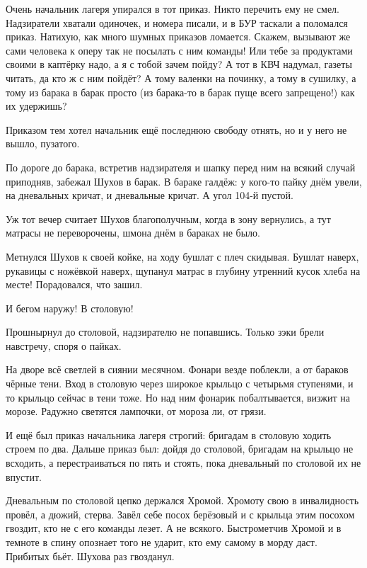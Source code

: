 Очень начальник лагеря упирался в тот приказ. Никто перечить ему не смел. Надзиратели
хватали одиночек, и номера писали, и в БУР таскали \dash а поломался приказ. Натихую, как много
шумных приказов ломается. Скажем, вызывают же сами человека к оперу \dash так не посылать с ним
команды! Или тебе за продуктами своими в каптёрку надо, а я с тобой зачем пойду? А тот в КВЧ
надумал, газеты читать, да кто ж с ним пойдёт? А тому валенки на починку, а тому в сушилку, а
тому из барака в барак просто (из барака-то в барак пуще всего запрещено!) \dash как их удержишь?

Приказом тем хотел начальник ещё последнюю свободу отнять, но и у него не вышло, пузатого.

По дороге до барака, встретив надзирателя и шапку перед ним на всякий случай приподняв,
забежал Шухов в барак. В бараке \dash галдёж: у кого-то пайку днём увели, на дневальных кричат, и
дневальные кричат. А угол 104-й пустой.

Уж тот вечер считает Шухов благополучным, когда в зону вернулись, а тут матрасы не
переворочены, шмона днём в бараках не было.

Метнулся Шухов к своей койке, на ходу бушлат с плеч скидывая. Бушлат \dash наверх, рукавицы с
ножёвкой \dash наверх, щупанул матрас в глубину \dash утренний кусок хлеба на месте! Порадовался,
что зашил.

И бегом \dash наружу! В столовую!

Прошнырнул до столовой, надзирателю не попавшись. Только зэки брели навстречу, споря о
пайках.

На дворе всё светлей в сиянии месячном. Фонари везде поблекли, а от бараков \dash чёрные тени.
Вход в столовую \dash через широкое крыльцо с четырьмя ступенями, и то крыльцо сейчас \dash в тени
тоже. Но над ним фонарик побалтывается, визжит на морозе. Радужно светятся лампочки, от
мороза ли, от грязи.

И ещё был приказ начальника лагеря строгий: бригадам в столовую ходить строем по два. Дальше
приказ был: дойдя до столовой, бригадам на крыльцо не всходить, а перестраиваться по пять и
стоять, пока дневальный по столовой их не впустит.

Дневальным по столовой цепко держался Хромой. Хромоту свою в инвалидность провёл, а дюжий,
стерва. Завёл себе посох берёзовый и с крыльца этим посохом гвоздит, кто не с его команды
лезет. А не всякого. Быстрометчив Хромой и в темноте в спину опознает \dash того не ударит, кто
ему самому в морду даст. Прибитых бьёт. Шухова раз гвозданул.

